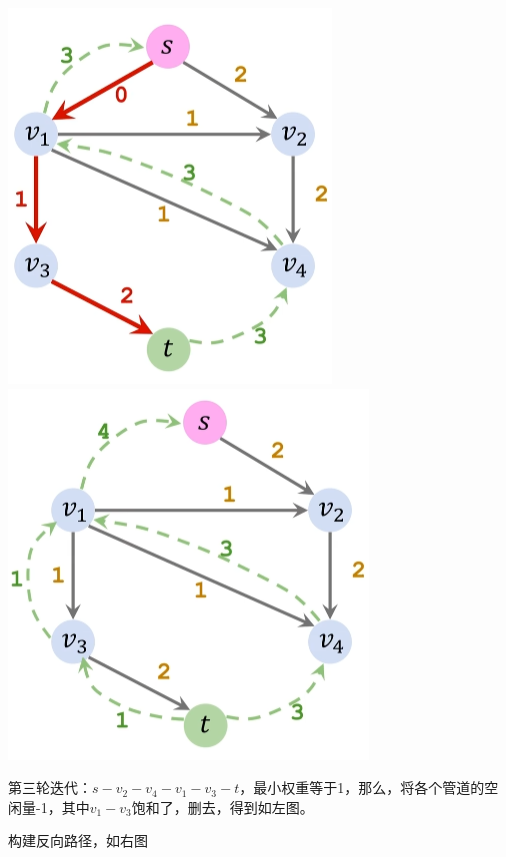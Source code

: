 \documentclass[a4paper]{article}    %
\begin{document}
\begin{center}
    \includegraphics[scale=0.5]{30.png}
    \includegraphics[scale=0.5]{31.png}
\end{center}

第三轮迭代：$s-v_2-v_4-v_1-v_3-t$，最小权重等于1，那么，将各个管道的空闲量-1，其中$v_1-v_3$饱和了，删去，得到如左图。

构建反向路径，如右图
\end{document}
